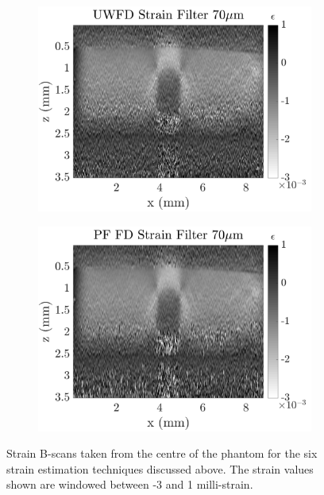 \begin{figure}[b!]
\begin{subfigure}{0.49\textwidth}
        \includegraphics[width=\textwidth]{figures/uwfd_fr70_lr0.png}
	\end{subfigure}
    \begin{subfigure}{0.49\textwidth}
    	\centering
        \includegraphics[width=\textwidth]{figures/fdsm_fr70_lr0.png}
    \end{subfigure}
    \caption{Strain B-scans taken from the centre of the phantom for the six strain estimation techniques discussed above. The strain values shown are windowed between -3 and 1 milli-strain.}
    \label{bscan_images_1}	
\end{figure}

